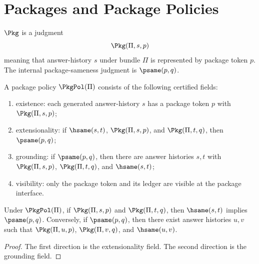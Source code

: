 \chapter{Packages and Package Policies}
\label{ch:core-packages-and-package-policies}

\begin{definition}
\label{def:core-package-token-and-package-sameness}
\(\Pkg\) is a judgment
$$
\Pkg(\Pi,s,p)
$$
meaning that answer-history \(s\) under bundle \(\Pi\) is represented by package token \(p\). The internal package-sameness judgment is \(\psame(p,q)\).
\end{definition}

\begin{definition}
A package policy \(\PkgPol(\Pi)\) consists of the following certified fields:
\begin{enumerate}
  \item existence: each generated answer-history \(s\) has a package token \(p\) with \(\Pkg(\Pi,s,p)\);
  \item extensionality: if \(\hsame(s,t)\), \(\Pkg(\Pi,s,p)\), and \(\Pkg(\Pi,t,q)\), then \(\psame(p,q)\);
  \item grounding: if \(\psame(p,q)\), then there are answer histories \(s,t\) with \(\Pkg(\Pi,s,p)\), \(\Pkg(\Pi,t,q)\), and \(\hsame(s,t)\);
  \item visibility: only the package token and its ledger are visible at the package interface.
\end{enumerate}
\end{definition}

\begin{theorem}
\label{thm:packages-classify-signatures-core}
Under $\PkgPol(\Pi)$, if $\Pkg(\Pi,s,p)$ and $\Pkg(\Pi,t,q)$, then
$\hsame(s,t)$ implies $\psame(p,q)$. Conversely, if $\psame(p,q)$, then
there exist answer histories $u,v$ such that $\Pkg(\Pi,u,p)$,
$\Pkg(\Pi,v,q)$, and $\hsame(u,v)$.
\end{theorem}
\begin{proof}
The first direction is the extensionality field. The second direction is the
grounding field.
\end{proof}

